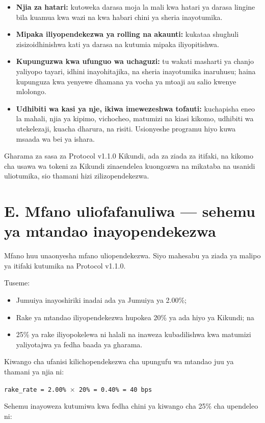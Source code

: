 \documentclass[11pt]{article}
\begin{document}
\begin{itemize}[leftmargin=*]
\item \textbf{Njia za hatari:} kutoweka darasa moja la mali kwa hatari ya darasa lingine bila kuamua kwa wazi na kwa habari chini ya sheria inayotumika.
\item \textbf{Mipaka iliyopendekezwa ya rolling na akaunti:} kukataa shughuli zisizoidhinishwa kati ya darasa na kutumia mipaka iliyopitishwa.
\item \textbf{Kupunguzwa kwa ufunguo wa uchaguzi:} tu wakati masharti ya chanjo yaliyopo tayari, idhini inayohitajika, na sheria inayotumika inaruhusu; haina kupunguza kwa yenyewe dhamana ya vocha ya mtoaji au salio kwenye mlolongo.
\item \textbf{Udhibiti wa kasi ya nje, ikiwa imewezeshwa tofauti:} kuchapisha eneo la mahali, njia ya kipimo, vichocheo, matumizi na kiasi kikomo, udhibiti wa utekelezaji, kuacha dharura, na risiti. Usionyeshe programu hiyo kuwa msaada wa bei ya ishara.
\end{itemize}
Gharama za sasa za Protocol v1.1.0 Kikundi, ada za ziada za itifaki, na kikomo cha usawa wa tokeni za Kikundi zinaendelea kuongozwa na mikataba na usanidi uliotumika, sio thamani hizi zilizopendekezwa.


\section*{E. Mfano uliofafanuliwa --- sehemu ya mtandao inayopendekezwa}

Mfano huu unaonyesha mfano uliopendekezwa. Siyo mahesabu ya ziada ya malipo ya itifaki kutumika na Protocol v1.1.0.

Tuseme:

\begin{itemize}[leftmargin=*]
\item Jumuiya inayoshiriki inadai ada ya Jumuiya ya 2.00\%;
\item Rake ya mtandao iliyopendekezwa hupokea 20\% ya ada hiyo ya Kikundi; na
\item 25\% ya rake iliyopokelewa ni halali na inaweza kubadilishwa kwa matumizi yaliyotajwa ya fedha baada ya gharama.
\end{itemize}
Kiwango cha ufanisi kilichopendekezwa cha upungufu wa mtandao juu ya thamani ya njia ni:

\texttt{rake\_rate = 2.00\% $\times$ 20\% = 0.40\% = 40 bps}

Sehemu inayoweza kutumiwa kwa fedha chini ya kiwango cha 25\% cha upendeleo ni:
\end{document}
